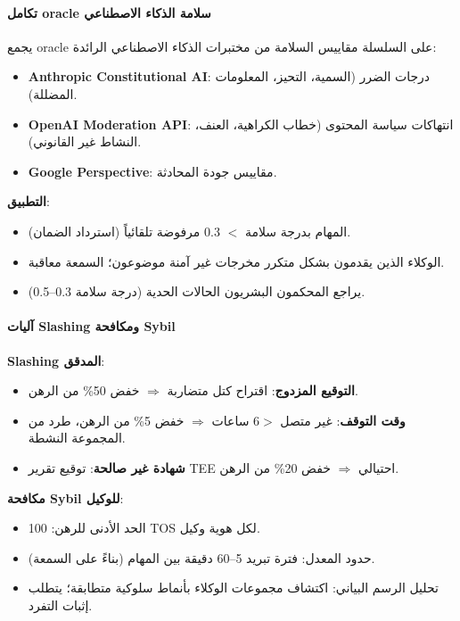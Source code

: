 \documentclass[11pt]{article}
\begin{document}
\paragraph{تكامل oracle سلامة الذكاء الاصطناعي}
يجمع oracle على السلسلة مقاييس السلامة من مختبرات الذكاء الاصطناعي الرائدة:
\begin{itemize}[noitemsep]
  \item \textbf{Anthropic Constitutional AI}: درجات الضرر (السمية، التحيز، المعلومات المضللة).
  \item \textbf{OpenAI Moderation API}: انتهاكات سياسة المحتوى (خطاب الكراهية، العنف، النشاط غير القانوني).
  \item \textbf{Google Perspective}: مقاييس جودة المحادثة.
\end{itemize}

\textbf{التطبيق}:
\begin{itemize}[noitemsep]
  \item المهام بدرجة سلامة $<$ 0.3 مرفوضة تلقائياً (استرداد الضمان).
  \item الوكلاء الذين يقدمون بشكل متكرر مخرجات غير آمنة موضوعون؛ السمعة معاقبة.
  \item يراجع المحكمون البشريون الحالات الحدية (درجة سلامة 0.3--0.5).
\end{itemize}

\paragraph{آليات Slashing ومكافحة Sybil}
\textbf{Slashing المدقق}:
\begin{itemize}[noitemsep]
  \item \textbf{التوقيع المزدوج}: اقتراح كتل متضاربة $\Rightarrow$ خفض 50\% من الرهن.
  \item \textbf{وقت التوقف}: غير متصل $>$6 ساعات $\Rightarrow$ خفض 5\% من الرهن، طرد من المجموعة النشطة.
  \item \textbf{شهادة غير صالحة}: توقيع تقرير TEE احتيالي $\Rightarrow$ خفض 20\% من الرهن.
\end{itemize}

\textbf{مكافحة Sybil للوكيل}:
\begin{itemize}[noitemsep]
  \item الحد الأدنى للرهن: 100 TOS لكل هوية وكيل.
  \item حدود المعدل: فترة تبريد 5--60 دقيقة بين المهام (بناءً على السمعة).
  \item تحليل الرسم البياني: اكتشاف مجموعات الوكلاء بأنماط سلوكية متطابقة؛ يتطلب إثبات التفرد.
\end{itemize}
\end{document}
